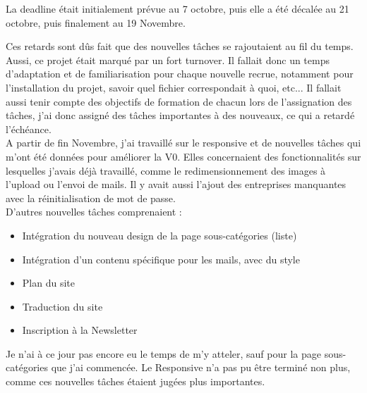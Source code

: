 La deadline était initialement prévue au 7 octobre, puis elle a été décalée au 21 octobre, puis finalement au 19 Novembre.

Ces retards sont dûs fait que des nouvelles tâches se rajoutaient au fil du temps. 
Aussi, ce projet était marqué par un fort turnover. 
Il fallait donc un temps d'adaptation et de familiarisation pour chaque nouvelle recrue, notamment pour l'installation du projet, savoir quel fichier correspondait à quoi, etc...
Il fallait aussi tenir compte des objectifs de formation de chacun lors de l'assignation des tâches, j'ai donc assigné des tâches importantes à des nouveaux, ce qui a retardé l'échéance.\\

A partir de fin Novembre, j'ai travaillé sur le responsive et de nouvelles tâches qui m'ont été données pour améliorer la V0.
Elles concernaient des fonctionnalités sur lesquelles j'avais déjà travaillé, comme le redimensionnement des images à l'upload ou l'envoi de mails.
Il y avait aussi l'ajout des entreprises manquantes avec la réinitialisation de mot de passe.\\

D'autres nouvelles tâches comprenaient : 

\begin{itemize}
    \item Intégration du nouveau design de la page sous-catégories (liste)
    \item Intégration d'un contenu spécifique pour les mails, avec du style
    \item Plan du site
    \item Traduction du site
    \item Inscription à la Newsletter
\end{itemize}

Je n'ai à ce jour pas encore eu le temps de m'y atteler, sauf pour la page sous-catégories que j'ai commencée.
Le Responsive n'a pas pu être terminé non plus, comme ces nouvelles tâches étaient jugées plus importantes.





